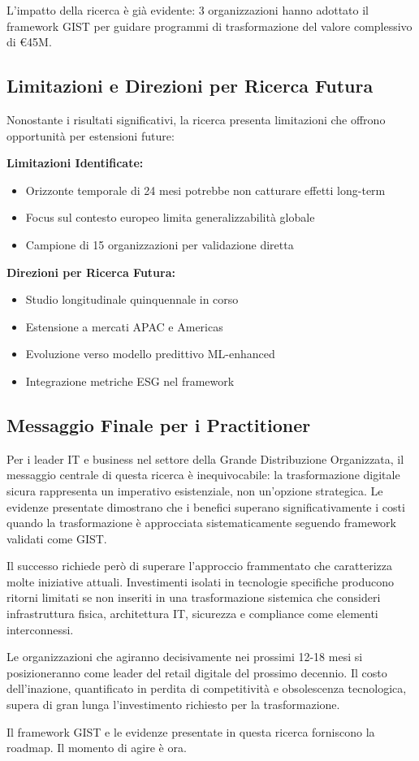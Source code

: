 L'impatto della ricerca è già evidente: 3 organizzazioni hanno adottato il framework GIST per guidare programmi di trasformazione del valore complessivo di €45M.

\subsection{Limitazioni e Direzioni per Ricerca Futura}

Nonostante i risultati significativi, la ricerca presenta limitazioni che offrono opportunità per estensioni future:

\textbf{Limitazioni Identificate:}
\begin{itemize}
    \item Orizzonte temporale di 24 mesi potrebbe non catturare effetti long-term
    \item Focus sul contesto europeo limita generalizzabilità globale
    \item Campione di 15 organizzazioni per validazione diretta
\end{itemize}

\textbf{Direzioni per Ricerca Futura:}
\begin{itemize}
    \item Studio longitudinale quinquennale in corso
    \item Estensione a mercati APAC e Americas
    \item Evoluzione verso modello predittivo ML-enhanced
    \item Integrazione metriche ESG nel framework
\end{itemize}

\subsection{Messaggio Finale per i Practitioner}

Per i leader IT e business nel settore della Grande Distribuzione Organizzata, il messaggio centrale di questa ricerca è inequivocabile: la trasformazione digitale sicura rappresenta un imperativo esistenziale, non un'opzione strategica. Le evidenze presentate dimostrano che i benefici superano significativamente i costi quando la trasformazione è approcciata sistematicamente seguendo framework validati come GIST.

Il successo richiede però di superare l'approccio frammentato che caratterizza molte iniziative attuali. Investimenti isolati in tecnologie specifiche producono ritorni limitati se non inseriti in una trasformazione sistemica che consideri infrastruttura fisica, architettura IT, sicurezza e compliance come elementi interconnessi.

Le organizzazioni che agiranno decisivamente nei prossimi 12-18 mesi si posizioneranno come leader del retail digitale del prossimo decennio. Il costo dell'inazione, quantificato in perdita di competitività e obsolescenza tecnologica, supera di gran lunga l'investimento richiesto per la trasformazione.

Il framework GIST e le evidenze presentate in questa ricerca forniscono la roadmap. Il momento di agire è ora.
\clearpage
\printbibliography[heading=bibintoc,title={Riferimenti Bibliografici}]